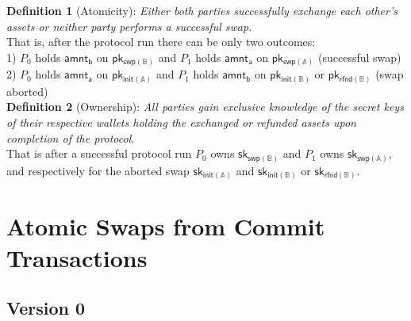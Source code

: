 \documentclass{article}      	%
\begin{document}
\textbf{Definition 1} (Atomicity): \textit{Either both parties successfully exchange each other's assets or neither party performs a successful swap.}
\vspace{0.5em}
\\
That is, after the protocol run there can be only two outcomes: \\
1) $P_0$ holds $\mathsf{amnt_b}$ on $\mathsf{pk_{swp(\mathbb{B})}}$ and $P_1$ holds $\mathsf{amnt_a}$ on $\mathsf{pk_{swp(\mathbb{A})}}$ (successful swap) \\
2) $P_0$ holds $\mathsf{amnt_a}$ on $\mathsf{pk_{init(\mathbb{A})}}$ and $P_1$ holds $\mathsf{amnt_b}$ on $\mathsf{pk_{init(\mathbb{B})}}$ or $\mathsf{pk_{rfnd(\mathbb{B})}}$ (swap aborted) \\

\textbf{Definition 2} (Ownership): \textit{All parties gain exclusive knowledge of the secret keys of their respective wallets holding the exchanged or refunded assets upon completion of the protocol.} 
\vspace{0.5em}
\\
That is after a successful protocol run $P_0$ owns $\mathsf{sk_{swp(\mathbb{B})}}$ and $P_1$ owns $\mathsf{sk_{swp(\mathbb{A})}}$, and respectively for the aborted swap  $\mathsf{sk_{init(\mathbb{A})}}$ and $\mathsf{sk_{init(\mathbb{B})}}$ or $\mathsf{sk_{rfnd(\mathbb{B})}}$. \\


\section{Atomic Swaps from Commit Transactions}







\subsection{Version 0}
\end{document}
